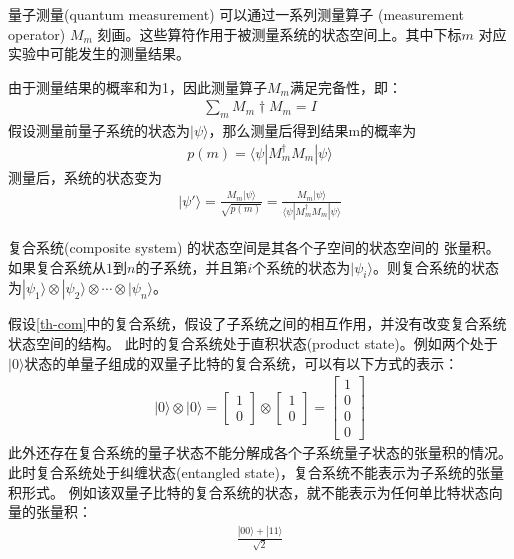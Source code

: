 \begin{theorem}
    量子测量(quantum measurement) 可以通过一系列测量算子 (measurement operator) ${M_m}$ 刻画。这些算符作用于被测量系统的状态空间上。其中下标$m$
   对应实验中可能发生的测量结果。
\end{theorem}
由于测量结果的概率和为1，因此测量算子${M_m}$满足完备性，即：
\begin{align}
    \sum_m M_m\dagger M_m = I
\end{align}
假设测量前量子系统的状态为\(|\psi\rangle\)，那么测量后得到结果m的概率为
\begin{align}
    p(m) = \langle\psi|M_m^\dagger M_m|\psi\rangle
\end{align}
测量后，系统的状态变为
\begin{align}
    |\psi'\rangle =  \frac{M_m|\psi\rangle}{\sqrt{p(m)}} = \frac{M_m|\psi\rangle}{\langle\psi|M_m^\dagger M_m|\psi\rangle}
\end{align}
\begin{theorem}
    复合系统(composite system) 的状态空间是其各个子空间的状态空间的
    张量积。如果复合系统从$1$到$n$的子系统，并且第$i$个系统的状态为$|\psi_i\rangle$。则复合系统的状态为\(|\psi_1\rangle\otimes|\psi_2\rangle\otimes\cdots\otimes |\psi_n\rangle\)。
    \label{th-com}
\end{theorem}
假设\ref{th-com}中的复合系统，假设了子系统之间的相互作用，并没有改变复合系统状态空间的结构。
此时的复合系统处于直积状态(product state)。例如两个处于\(|0\rangle\)状态的单量子组成的双量子比特的复合系统，可以有以下方式的表示：
\begin{align}
    |0\rangle\otimes|0\rangle=\left[\begin{matrix}
        1\\0
    \end{matrix}\right]\otimes\left[\begin{matrix}
        1\\0
    \end{matrix}\right] = \left[\begin{matrix}
        1\\0\\0\\0
    \end{matrix}\right]
\end{align}
此外还存在复合系统的量子状态不能分解成各个子系统量子状态的张量积的情况。此时复合系统处于纠缠状态(entangled state)，复合系统不能表示为子系统的张量积形式。
例如该双量子比特的复合系统的状态，就不能表示为任何单比特状态向量的张量积：
\begin{align}
    \frac{|00\rangle+|11\rangle}{\sqrt{2}}
\end{align}
